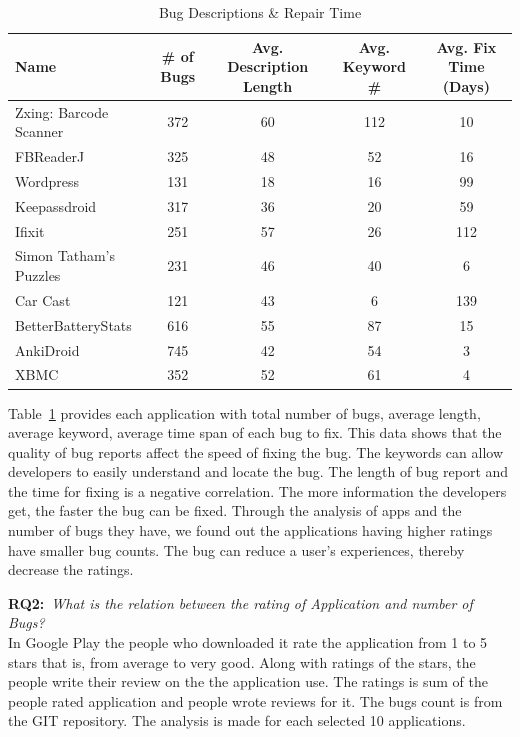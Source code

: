 \documentclass{sig-alternate}
\begin{document}
\begin{table}[h]
\begin{center}
\caption{Bug Descriptions \& Repair Time}
\label{Table:appAvgs}
  \begin{tabular}{ | l | c | c | c | c |  } \hline

     \bfseries Name  & \bfseries \# of Bugs & \bfseries Avg. Description Length & \bfseries Avg. Keyword \# & \bfseries Avg. Fix Time (Days) \\ \hline
 
	Zxing: Barcode Scanner & 372 & 60 & 112 & 10 \\ \hline
	FBReaderJ & 325 & 48 & 52 & 16 \\ \hline
	Wordpress & 131 & 18 & 16 & 99 \\ \hline
	Keepassdroid & 317 & 36 & 20 & 59 \\ \hline
	Ifixit & 251 & 57 & 26 & 112 \\ \hline
	Simon Tatham's Puzzles & 231 & 46 & 40 & 6 \\ \hline
	Car Cast & 121 & 43 & 6 & 139 \\ \hline
	BetterBatteryStats & 616 & 55 & 87 & 15 \\ \hline
	AnkiDroid & 745 & 42 & 54 & 3 \\ \hline
	XBMC & 352 & 52 & 61 & 4 \\ \hline
 
  \end{tabular}
  \end{center}
\end{table}



Table~\ref{Table:appAvgs} provides each application with total number of bugs, average length, average keyword, average time span of each bug to fix. This data shows that the quality of bug reports affect the speed of fixing the bug. The keywords can allow developers to easily understand and locate the bug. The length of bug report and the time for fixing is a negative correlation. The more information the developers get, the faster the bug can be fixed. Through the analysis of apps and the number of bugs they have, we found out the applications having higher ratings have smaller bug counts. The bug can reduce a user's experiences, thereby decrease the ratings.

\noindent
\textbf{RQ2:}~\emph{What is the relation between the rating of Application and number of Bugs?}\\

In Google Play the people who downloaded it rate the application from 1 to 5 stars that is, from average to very good. Along with ratings of the stars, the people write their review on the the application use. The ratings is sum of the people rated application and people wrote reviews for it. The bugs count is from the GIT repository. The analysis is made for each selected 10 applications.
\end{document}
